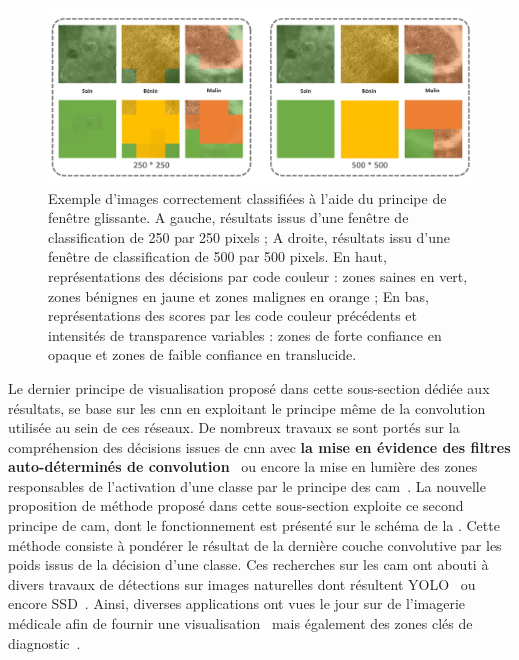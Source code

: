 \begin{figure}[H]
    \centering
    \includegraphics[width=\linewidth]{contents/chapter_6/resources/exemple_image_improvement_well.pdf}
    \caption{Exemple d'images correctement classifiées à l'aide du principe de fenêtre glissante. A gauche, résultats issus d'une fenêtre de classification de 250 par 250 pixels ; A droite, résultats issu d'une fenêtre de classification de 500 par 500 pixels. En haut, représentations des décisions par code couleur : zones saines en vert, zones bénignes en jaune et zones malignes en orange ; En bas, représentations des scores par les code couleur précédents et intensités de transparence variables : zones de forte confiance en opaque et zones de faible confiance en translucide.}
    \label{fig:exemple_image_improvement_well}
\end{figure}\par

Le dernier principe de visualisation proposé dans cette sous-section dédiée aux résultats, se base sur les \gls{cnn} en exploitant le principe même de la convolution utilisée au sein de ces réseaux. De nombreux travaux se sont portés sur la compréhension des décisions issues de \gls{cnn} avec \textbf{la mise en évidence des filtres auto-déterminés de convolution}~\cite{Zeiler2014} ou encore la mise en lumière des zones responsables de l'activation d'une classe par le principe des \acrlong{cam}~\cite{Zhou2015}. La nouvelle proposition de méthode proposé dans cette sous-section exploite ce second principe de \gls{cam}, dont le fonctionnement est présenté sur le schéma de la . Cette méthode consiste à pondérer le résultat de la dernière couche convolutive par les poids issus de la décision d'une classe. Ces recherches sur les \gls{cam} ont abouti à divers travaux de détections sur images naturelles dont résultent YOLO~\cite{Redmon2016} ou encore SSD~\cite{Liu2016}. Ainsi, diverses applications ont vues le jour sur de l'imagerie médicale afin de fournir une visualisation~\cite{jia2017} mais également des zones clés de diagnostic~\cite{Park2019}.\par 
\clearpage

